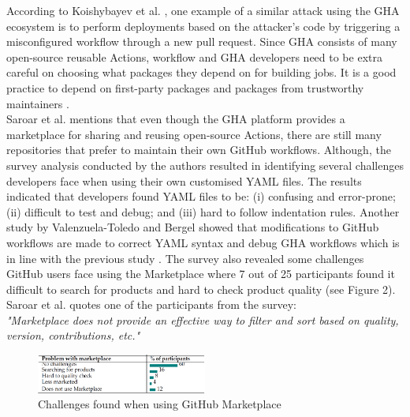 \documentclass[conference]{IEEEtran}
\begin{document}
        According to Koishybayev et al. \cite{koishybayev2022characterizing}, one example of a similar attack using the GHA ecosystem is to perform deployments based on the attacker’s code by triggering a misconfigured workflow through a new pull request. Since GHA consists of many open-source reusable Actions, workflow and GHA developers need to be extra careful on choosing what packages they depend on for building jobs. It is a good practice to depend on first-party packages and packages from trustworthy maintainers \cite{zimmermann2019small}. \\

        Saroar et al. \cite{saroar2023developers} mentions that even though the GHA platform provides a marketplace for sharing and reusing open-source Actions, there are still many repositories that prefer to maintain their own GitHub workflows. Although, the survey analysis conducted by the authors resulted in identifying several challenges developers face when using their own customised YAML files.  The results indicated that developers found YAML files to be: (i) confusing and error-prone; (ii) difficult to test and debug; and (iii) hard to follow indentation rules. Another study by Valenzuela-Toledo and Bergel \cite{valenzuela2022evolution}  showed that modifications to GitHub workflows are made to correct YAML syntax and debug GHA workflows which is in line with the previous study \cite{saroar2023developers}. The survey also revealed some challenges GitHub users face using the Marketplace where 7 out of 25 participants found it difficult to search for products and hard to check product quality (see Figure 2). Saroar et al. \cite{saroar2023developers} quotes one of the participants from the survey: \\

\textit{"Marketplace does not provide an effective way to filter and sort based on quality, version, contributions, etc."}\\

\begin{figure} [h]
\includegraphics[width=0.5\textwidth]{Table 1.png}
\caption{Challenges found when using GitHub Marketplace \cite{saroar2023developers} }
\end{figure}

\end{document}

